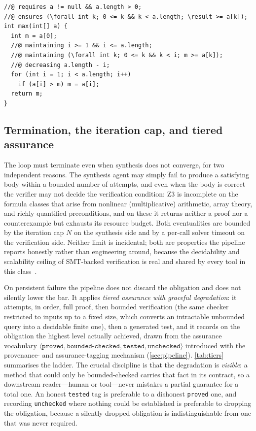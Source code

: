 \begin{lstlisting}[style=code,caption={A loop body synthesized by the agent (running maximum) annotated with the loop invariant supplied by the inferrer; the quantified clause is what lets ESC discharge the postcondition at loop exit.},label={lst:invariant}]
//@ requires a != null && a.length > 0;
//@ ensures (\forall int k; 0 <= k && k < a.length; \result >= a[k]);
int max(int[] a) {
  int m = a[0];
  //@ maintaining i >= 1 && i <= a.length;
  //@ maintaining (\forall int k; 0 <= k && k < i; m >= a[k]);
  //@ decreasing a.length - i;
  for (int i = 1; i < a.length; i++)
    if (a[i] > m) m = a[i];
  return m;
}
\end{lstlisting}

\subsection{Termination, the iteration cap, and tiered assurance}
\label{subsec:tiered}

The loop must terminate even when synthesis does not converge, for two independent reasons. The synthesis agent may simply fail to produce a satisfying body within a bounded number of attempts, and even when the body is correct the verifier may not decide the verification condition: Z3 is incomplete on the formula classes that arise from nonlinear (multiplicative) arithmetic, array theory, and richly quantified preconditions, and on these it returns neither a proof nor a counterexample but exhausts its resource budget. Both eventualities are bounded by the iteration cap $N$ on the synthesis side and by a per-call solver timeout on the verification side. Neither limit is incidental; both are properties the pipeline reports honestly rather than engineering around, because the decidability and scalability ceiling of SMT-backed verification is real and shared by every tool in this class~\cite{cok2014openjml,demoura2008z3,barbosa2022cvc5}.

On persistent failure the pipeline does not discard the obligation and does not silently lower the bar. It applies \emph{tiered assurance with graceful degradation}: it attempts, in order, full proof, then bounded verification (the same checker restricted to inputs up to a fixed size, which converts an intractable unbounded query into a decidable finite one), then a generated test, and it records on the obligation the highest level actually achieved, drawn from the assurance vocabulary $\langle \texttt{proved}, \texttt{bounded-checked}, \texttt{tested}, \texttt{unchecked}\rangle$ introduced with the provenance- and assurance-tagging mechanism (\cref{sec:pipeline}). \cref{tab:tiers} summarises the ladder. The crucial discipline is that the degradation is \emph{visible}: a method that could only be bounded-checked carries that fact in its contract, so a downstream reader---human or tool---never mistakes a partial guarantee for a total one. An honest \texttt{tested} tag is preferable to a dishonest \texttt{proved} one, and recording \texttt{unchecked} where nothing could be established is preferable to dropping the obligation, because a silently dropped obligation is indistinguishable from one that was never required.

